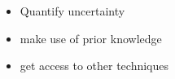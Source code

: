 \begin{itemize}
    \item Quantify uncertainty
    \item make use of prior knowledge
    \item get access to other techniques
\end{itemize}




